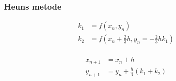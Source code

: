 %
%
%
\begin{frame}
\frametitle{Heuns metode }
\begin{minipage}[b]{0.31\textwidth}
\begin{align*}
k_1 & = f(x_n , y_n) \\
k_2 & = f \left( x_n + \frac{2}{3} h , y_n = + \frac{2}{3} h k_1 \right) \\
\end{align*}
%
\end{minipage} 
\phantom{Hej}
\begin{minipage}[b]{0.31\textwidth}
\begin{align*}
x_{n+1} & = x_n+h \\
y_{n+1} & = y_n + \frac{h}{4} (k_1 + k_2 )  \\
\end{align*}
%
\end{minipage} 
\\

\\
\phantom{H}
\\
\end{frame}